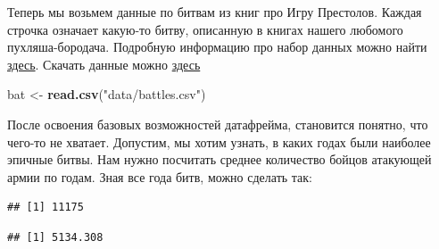 \documentclass[]{book}
\newenvironment{Shaded}{\begin{snugshade}}{\end{snugshade}}
\newcommand{\KeywordTok}[1]{\textcolor[rgb]{0.13,0.29,0.53}{\textbf{#1}}}
\newcommand{\DataTypeTok}[1]{\textcolor[rgb]{0.13,0.29,0.53}{#1}}
\newcommand{\DecValTok}[1]{\textcolor[rgb]{0.00,0.00,0.81}{#1}}
\newcommand{\StringTok}[1]{\textcolor[rgb]{0.31,0.60,0.02}{#1}}
\newcommand{\OperatorTok}[1]{\textcolor[rgb]{0.81,0.36,0.00}{\textbf{#1}}}
\newcommand{\NormalTok}[1]{#1}
\begin{document}
Теперь мы возьмем данные по битвам из книг про Игру Престолов. Каждая
строчка означает какую-то битву, описанную в книгах нашего любомого
пухляша-бородача. Подробную информацию про набор данных можно найти
\href{https://www.kaggle.com/mylesoneill/game-of-thrones}{здесь}.
Скачать данные можно
\href{https://raw.githubusercontent.com/Pozdniakov/stats/master/data/character-deaths.csv}{здесь}

\begin{Shaded}
\begin{Highlighting}[]
\NormalTok{bat <-}\StringTok{ }\KeywordTok{read.csv}\NormalTok{(}\StringTok{"data/battles.csv"}\NormalTok{)}
\end{Highlighting}
\end{Shaded}

После освоения базовых возможностей датафрейма, становится понятно, что
чего-то не хватает. Допустим, мы хотим узнать, в каких годах были
наиболее эпичные битвы. Нам нужно посчитать среднее количество бойцов
атакующей армии по годам. Зная все года битв, можно сделать так:

\begin{Shaded}
\end{Shaded}

\begin{verbatim}
## [1] 11175
\end{verbatim}

\begin{Shaded}
\end{Shaded}

\begin{verbatim}
## [1] 5134.308
\end{verbatim}

\begin{Shaded}
\end{Shaded}
\end{document}
